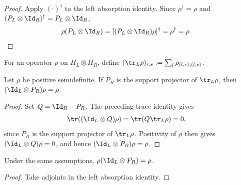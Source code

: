 \begin{proof}
    \leanok
    Apply $(\cdot)^\dagger$ to the left absorption identity. Since
    $\rho^\dagger=\rho$ and
    $(P_L\otimes\Id_R)^\dagger=P_L\otimes\Id_R$,
    \begin{align}
        \rho(P_L\otimes\Id_R)
        &=[(P_L\otimes\Id_R)\rho]^\dagger =\rho^\dagger =\rho.
        \notag
    \end{align}
\end{proof}

\begin{definition}
    \label{def:partial_trace_left}
    \leanok
    For an operator $\rho$ on $H_L\otimes H_R$, define
    $(\tr_L\rho)_{r,s}:=\sum_l\rho_{(l,r),(l,s)}$.
\end{definition}

\begin{theorem}
    \label{thm:right_marginal_support_left_absorption}
    \leanok
    Let $\rho$ be positive semidefinite. If $P_R$ is the support projector of
    $\tr_L\rho$, then
    $(\Id_L\otimes P_R)\rho=\rho$.
\end{theorem}

\begin{proof}
    \leanok
    Set $Q=\Id_R-P_R$. The preceding trace identity gives
    \begin{align}
        \tr((\Id_L\otimes Q)\rho)
        &=\tr(Q\tr_L\rho) =0,
        \notag
    \end{align}
    since $P_R$ is the support projector of $\tr_L\rho$. Positivity of
    $\rho$ then gives $(\Id_L\otimes Q)\rho=0$, and hence
    $(\Id_L\otimes P_R)\rho=\rho$.
\end{proof}

\begin{theorem}
    \label{thm:right_marginal_support_right_absorption}
    \leanok
    Under the same assumptions,
    $\rho(\Id_L\otimes P_R)=\rho$.
\end{theorem}

\begin{proof}
    \leanok
    Take adjoints in the left absorption identity.
\end{proof}

